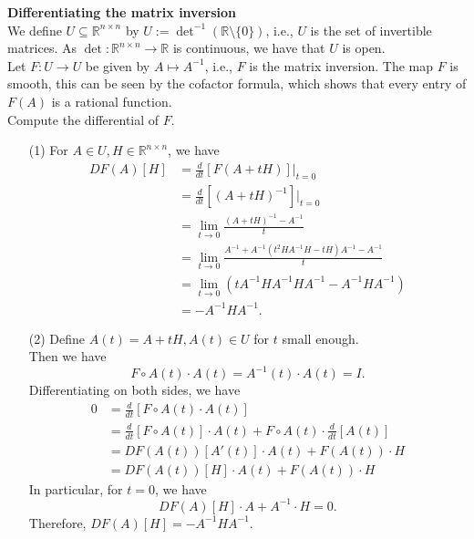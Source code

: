 \documentclass[en, oneside]{assignment}
\begin{document}
\begin{prob} \textbf{Differentiating the matrix inversion}\\
    We define $U \subseteq \mathbb{R}^{n \times n}$ by $U := \det^{-1}(\mathbb{R} \setminus \{0\})$, i.e., $U$ is the set of invertible matrices. 
    As $\det : \mathbb{R}^{n \times n} \to \mathbb{R}$ is continuous, we have that $U$ is open.\\
    Let $F : U \to U$ be given by $A \mapsto A^{-1}$, i.e., $F$ is the matrix inversion. 
    The map $F$ is smooth, this can be seen by the cofactor formula, which shows that every entry of $F(A)$ is a rational function.\\
    Compute the differential of $F$.
\end{prob}

\begin{sol}
    \begin{itemize}
        \item[(1)] For $A \in U, H \in \mathbb{R}^{n \times n}$, we have
        \begin{align*}
            DF(A)[H] & = \frac{d}{dt}\left[F(A + tH)\right]|_{t=0}\\
            & = \frac{d}{dt}\left[(A + tH)^{-1}\right]|_{t=0}\\
            & = \lim_{t \to 0}\frac{(A + tH)^{-1} - A^{-1}}{t}\\
            & = \lim_{t \to 0}\frac{A^{-1} + A^{-1}(t^2 H A^{-1} H - t H) A^{-1} - A^{-1}}{t}\\
            & = \lim_{t \to 0}(t A^{-1} H A^{-1} H A^{-1} - A^{-1} H A^{-1})\\
            & = - A^{-1} H A^{-1}.
        \end{align*}
        \item[(2)] Define $A(t) = A + tH, A(t) \in U$ for $t$ small enough.\\
        Then we have
        \begin{equation*}
            F \circ A(t) \cdot  A(t) = A^{-1}(t) \cdot  A(t) = I.
        \end{equation*}
        Differentiating on both sides, we have
        \begin{align*}
            0 & = \frac{d}{dt}\left[F \circ A(t) \cdot  A(t)\right]\\
            & = \frac{d}{dt}\left[F \circ A(t)\right] \cdot A(t) + F \circ A(t) \cdot  \frac{d}{dt}\left[A(t)\right]\\
            & = DF(A(t)) [A'(t)] \cdot A(t) + F(A(t)) \cdot H\\
            & = DF(A(t)) [H] \cdot A(t) + F(A(t)) \cdot H
        \end{align*}
        In particular, for $t = 0$, we have
        \begin{equation*}
            DF(A)[H] \cdot A + A^{-1} \cdot H = 0.
        \end{equation*}
        Therefore, $DF(A)[H] = - A^{-1} H A^{-1}$.
    \end{itemize}
\end{sol}
\end{document}
